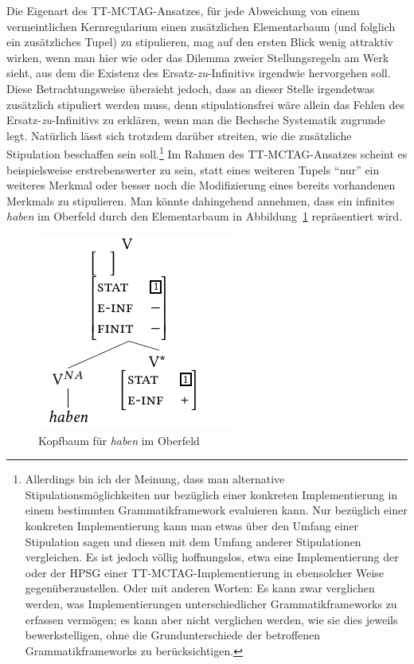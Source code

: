 Die Eigenart des TT-MCTAG-Ansatzes, für jede Abweichung von einem vermeintlichen Kernregularium einen zusätzlichen Elementarbaum (und folglich ein zusätzliches Tupel) zu stipulieren, mag auf den ersten Blick wenig attraktiv wirken, wenn man hier wie \cite{Bech:63} oder \cite{Vogel:09} das Dilemma zweier Stellungsregeln am Werk sieht, aus dem die Existenz des Ersatz-\emph{zu}-Infinitivs irgendwie hervorgehen soll. Diese Betrachtungsweise übersieht jedoch, dass an dieser Stelle irgendetwas zusätzlich stipuliert werden muss, denn stipulationsfrei wäre allein das Fehlen des Ersatz-\emph{zu}-Infinitivs zu erklären, wenn man die Bechsche Systematik zugrunde legt. Natürlich lässt sich trotzdem darüber streiten, wie die zusätzliche Stipulation beschaffen sein soll.\footnote{Allerdings bin ich der Meinung, dass man alternative Stipulationsmöglichkeiten nur bezüglich einer konkreten Implementierung in einem bestimmten Grammatikframework evaluieren kann. Nur bezüglich einer konkreten Implementierung kann man etwas über den Umfang einer Stipulation sagen und diesen mit dem Umfang anderer Stipulationen vergleichen. Es ist jedoch völlig hoffnungslos, etwa eine Implementierung der  oder der HPSG einer TT-MCTAG-Implementierung in ebensolcher Weise gegenüberzustellen. Oder mit anderen Worten: Es kann zwar verglichen werden, was Implementierungen unterschiedlicher Grammatikframeworks zu erfassen vermögen; es kann aber nicht verglichen werden, wie sie dies jeweils bewerkstelligen, ohne die Grundunterschiede der betroffenen Grammatikframeworks zu berücksichtigen.} Im Rahmen des TT-MCTAG-Ansatzes scheint es beispielsweise erstrebenswerter zu sein, statt eines weiteren Tupels "`nur"' ein weiteres Merkmal oder besser noch die Modifizierung eines bereits vorhandenen Merkmals zu stipulieren. Man könnte dahingehend annehmen, dass ein infinites {\it haben} im Oberfeld durch den Elementarbaum in Abbildung~\ref{fig-ttmctag-ersatzzu-2} repräsentiert wird.
\begin{figure}[t]
\centering
\includegraphics{graphics/abb721.pdf}
\caption{\label{fig-ttmctag-ersatzzu-2}Kopfbaum für {\it haben} im Oberfeld}
\end{figure}
